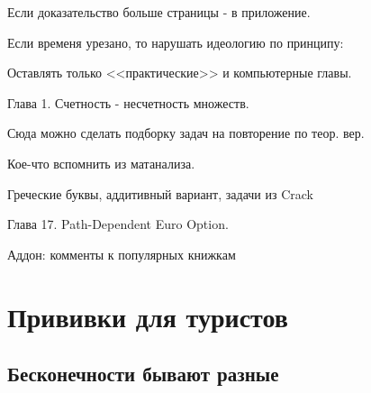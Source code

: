 {%



Если доказательство больше страницы - в приложение.


Если временя урезано, то нарушать идеологию по принципу: \par
Оставлять только <<практические>> и компьютерные главы. \par



Глава 1. Счетность - несчетность множеств. \par
Сюда можно сделать подборку задач на повторение по теор. вер. \par
Кое-что вспомнить из матанализа. \par

Греческие буквы, аддитивный вариант, задачи из Crack \par


Глава 17. Path-Dependent Euro Option. \par


Аддон: комменты к популярных книжкам \par



}
\section{Прививки для туристов} \subsection{Бесконечности бывают разные}

